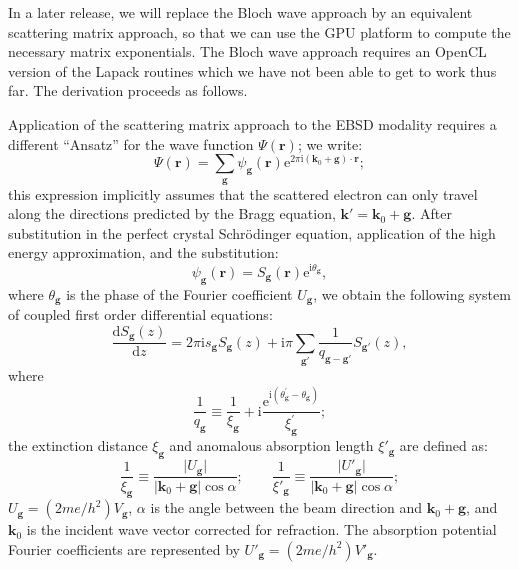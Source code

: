 \documentclass[DIV=calc, paper=letter, fontsize=11pt]{scrartcl}	 %
\begin{document}
{\small
In a later release, we will replace the Bloch wave approach by an equivalent scattering matrix approach, so that we can use the GPU platform
to compute the necessary matrix exponentials.  The Bloch wave approach requires an OpenCL version of the Lapack routines
which we have not been able to get to work thus far.  The derivation proceeds as follows.

Application of the scattering matrix approach to the EBSD modality requires a different ``Ansatz'' for the wave 
function $\Psi(\mathbf{r})$; we write:
\begin{equation}
	\Psi(\mathbf{r}) = \sum_{\mathbf{g}} \psi_{\mathbf{g}}(\mathbf{r}) 
	\mathrm{e}^{2\pi\mathrm{i}(\mathbf{k}_0+\mathbf{g})\cdot\mathbf{r}};\label{eq:planewaves}
\end{equation}
this expression implicitly assumes that the scattered electron can only travel along the directions predicted by the 
Bragg equation, $\mathbf{k}'=\mathbf{k}_0+\mathbf{g}$.  After substitution in the perfect crystal Schr\"odinger equation,
application of the high energy approximation, and the substitution:
\begin{equation}
	\psi_\mathbf{g}(\mathbf{r}) = S_{\mathbf{g}}(\mathbf{r}) \mathrm{e}^{\mathrm{i}\theta_{\mathbf{g}}},\label{eq:psig}
\end{equation}
where $\theta_{\mathbf{g}}$ is the phase of the Fourier coefficient $U_{\mathbf{g}}$, we obtain the following system of 
coupled first order differential equations:
\begin{equation}
    \frac{\mathrm{d} S_{\mathbf{g}}(z)}{\mathrm{d}z} =
    2\pi\mathrm{i}s_{\mathbf{g}}S_{\mathbf{g}}(z) + \mathrm{i}\pi {\sum_{\mathbf{g}'}}
    \frac{1}
    {q_{\mathbf{g}-\mathbf{g}'}}S_{\mathbf{g}'}(z),\label{eq:defectequation}
\end{equation}
where
\begin{equation}
	\frac{1}{q_{\mathbf{g}}} \equiv \frac{1}{\xi_{\mathbf{g}}} + \mathrm{i}
	\frac{\mathrm{e}^{\mathrm{i} (\theta^{\prime}_{\mathbf{g}}-\theta_{\mathbf{g}})}}{\xi^{\prime}_{\mathbf{g}}};
	\label{eq:defineq}
\end{equation}
the extinction distance $\xi_{\mathbf{g}}$ and anomalous absorption length $\xi'_{\mathbf{g}}$ are defined as:
\begin{equation}
	\frac{1}{\xi_{\mathbf{g}}}\equiv \frac{\vert U_{\mathbf{g}}\vert}{\vert\mathbf{k}_0+\mathbf{g}\vert\cos\alpha};\qquad
	\frac{1}{\xi'_{\mathbf{g}}}\equiv \frac{\vert U'_{\mathbf{g}}\vert}{\vert\mathbf{k}_0+\mathbf{g}\vert\cos\alpha};
\end{equation}
$U_{\mathbf{g}} = (2me/h^2) V_{\mathbf{g}} $, $\alpha$ is the angle between the beam direction and $\mathbf{k}_0+\mathbf{g}$, and $\mathbf{k}_0$ is 
the incident wave vector corrected for refraction.  The absorption potential Fourier coefficients are represented by $U'_{\mathbf{g}} = (2me/h^2) V'_{\mathbf{g}}$.

}
\end{document}
